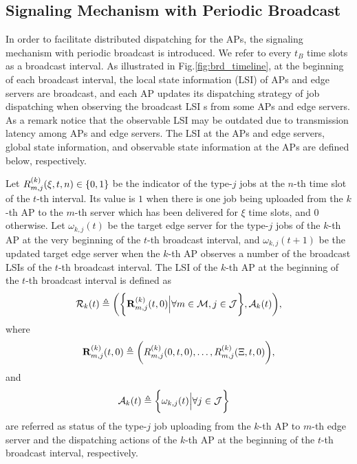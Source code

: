 \subsection{Signaling Mechanism with Periodic Broadcast}
\label{subsec:broadcast}
In order to facilitate distributed dispatching for the APs, {the signaling mechanism with periodic broadcast is introduced.}
We refer to every $t_B$ time slots as a broadcast interval.
As illustrated in Fig.\ref{fig:brd_timeline}, at the beginning of each broadcast interval, the local state information (LSI) of APs and edge servers are broadcast, and each AP updates its dispatching strategy of job dispatching when observing the broadcast LSI s from some APs and edge servers.
As a remark notice that the observable LSI may be outdated due to transmission latency among APs and edge servers.
The LSI at the APs and edge servers, global state information, and observable state information at the APs are defined below, respectively.

\begin{definition}
    Let $R^{(k)}_{m,j}(\xi,t,n) \in \{0,1\}$ be the indicator of the type-$j$ jobs at the $n$-th time slot of the $t$-th interval.
    Its value is $1$ when there is one job being uploaded from the $k$-th AP to the $m$-th server which has been delivered for $\xi$ time slots, and $0$ otherwise.
    Let $\omega_{k,j}(t)$ be the target edge server for the type-$j$ jobs of the $k$-th AP at the very beginning of the $t$-th broadcast interval, and $\omega_{k,j}(t+1)$ be the updated target edge server when the $k$-th AP observes a number of the broadcast LSIs of the $t$-th broadcast interval.
    The LSI of the $k$-th AP at the beginning of the $t$-th broadcast interval is defined as
    {\small
    \begin{align}
        \mathcal{R}_{k}(t) \triangleq
        \bigg(
            \bigg\{\mathbf{R}^{(k)}_{m,j}(t,0) \Big| \forall m\in\mathcal{M},j\in\mathcal{J}\bigg\},
            \mathcal{A}_{k}(t)
        \bigg),
    \end{align}
    }
    where
    \begin{align}
        \mathbf{R}^{(k)}_{m,j}(t,0) \triangleq \bigg(
            R^{(k)}_{m,j}(0,t,0), \dots, R^{(k)}_{m,j}(\Xi,t,0)
        \bigg),
    \end{align}
    and
    \begin{align}
        \mathcal{A}_{k}(t) &\triangleq \bigg\{\omega_{k,j}(t) \Big| \forall j\in\mathcal{J}\bigg\}
    \end{align}
    are referred as status of the type-$j$ job uploading from the $k$-th AP to $m$-th edge server and the dispatching actions of the $k$-th AP at the beginning of the $t$-th broadcast interval, respectively.
\end{definition}

